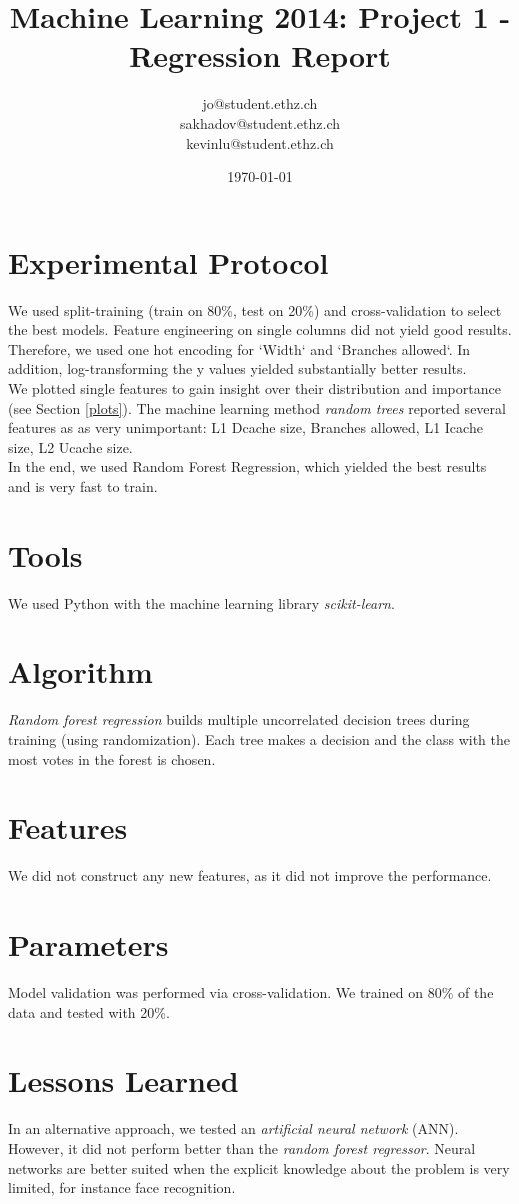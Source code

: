 \documentclass[a4paper, 11pt]{article}
\title{Machine Learning 2014: Project 1 - Regression Report}
\author{jo@student.ethz.ch\\ sakhadov@student.ethz.ch\\ kevinlu@student.ethz.ch\\}
\date{\today}
\begin{document}
\maketitle

\section*{Experimental Protocol}
We used split-training (train on 80\%, test on 20\%) and cross-validation to select the best models. Feature engineering on single columns did not yield good results. Therefore, we used one hot encoding for `Width` and `Branches allowed`. In addition, log-transforming the y values yielded substantially better results.\\
We plotted single features to gain insight over their distribution and importance (see Section \ref{plots}).
The machine learning method \textit{random trees} reported several features as as very unimportant: L1 Dcache size, Branches allowed, L1 Icache size, L2 Ucache size.\\
In the end, we used Random Forest Regression, which yielded the best results and is very fast to train.

\section{Tools}
We used Python with the machine learning library \textit{scikit-learn}.

\section{Algorithm}
\textit{Random forest regression} builds multiple uncorrelated decision trees during training (using randomization). Each tree makes a decision and the class with the most votes in the forest is chosen.

\section{Features}
We did not construct any new features, as it did not improve the performance.

\section{Parameters}
Model validation was performed via cross-validation. We trained on 80\% of the data and tested with 20\%.

\section{Lessons Learned} In an alternative approach, we tested an \textit{artificial neural network} (ANN). However, it did not perform better than the \textit{random forest regressor}. Neural networks are better suited when the explicit knowledge about the problem is very limited, for instance face recognition.
\end{document}
